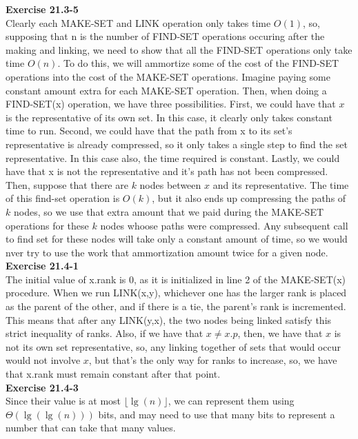 \documentclass{article}
\begin{document}
\noindent\textbf{Exercise 21.3-5}\\
Clearly each MAKE-SET and LINK operation only takes time $O(1)$, so, supposing that n is the number of FIND-SET operations occuring after the making and linking, we need to show that all the FIND-SET operations only take time $O(n)$. To do this, we will ammortize some of the cost of the FIND-SET operations into the cost of the MAKE-SET operations. Imagine paying some constant amount extra for each MAKE-SET operation. Then, when doing a FIND-SET(x) operation, we have three possibilities. First, we could have that $x$ is the representative of its own set. In this case, it clearly only takes constant time to run. Second, we could have that the path from x to its set's representative is already compressed, so it only takes a single step to find the set representative. In this case also, the time required is constant. Lastly, we could have that x is not the representative and it's path has not been compressed. Then, suppose that there are $k$ nodes between $x$ and its representative. The time of this find-set operation is $O(k)$, but it also ends up compressing the paths of $k$ nodes, so we use that extra amount that we paid during the MAKE-SET operations for these $k$ nodes whoose paths were compressed. Any subsequent call to find set for these nodes will take only a constant amount of time, so we would nver try to use the work that ammortization amount twice for a given node.\\

\noindent\textbf{Exercise 21.4-1}\\
The initial value of x.rank is 0, as it is initialized in line 2 of the MAKE-SET(x) procedure. When we run LINK(x,y), whichever one has the larger rank is placed as the parent of the other, and if there is a tie, the parent's rank is incremented. This means that after any LINK(y,x), the two nodes being linked satisfy this strict inequality of ranks. Also, if we have that $x\neq x.p$, then, we have that $x$ is not its own set representative, so, any linking together of sets that would occur would not involve $x$, but that's the only way for ranks to increase, so, we have that x.rank must remain constant after that point.\\


\noindent\textbf{Exercise 21.4-3}\\
Since their value is at most $\lfloor \lg(n)\rfloor$, we can represent them using $\Theta(\lg(\lg(n)))$ bits, and may need to use that many bits to represent a number that can take that many values.\\
\end{document}
